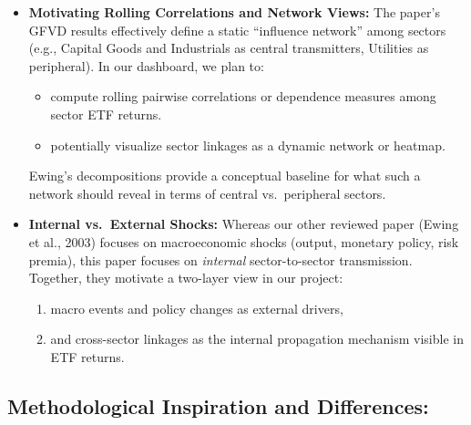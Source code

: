 \documentclass{article}
\begin{document}
\begin{itemize}
    \item \textbf{Motivating Rolling Correlations and Network Views:}  
    The paper’s GFVD results effectively define a static ``influence network'' among sectors (e.g., Capital Goods and Industrials as central transmitters, Utilities as peripheral). In our dashboard, we plan to:
    \begin{itemize}
        \item compute rolling pairwise correlations or dependence measures among sector ETF returns.
        \item potentially visualize sector linkages as a dynamic network or heatmap.
    \end{itemize}
    \noindent Ewing’s decompositions provide a conceptual baseline for what such a network should reveal in terms of central vs.\ peripheral sectors.

    \item \textbf{Internal vs.\ External Shocks:}  
    Whereas our other reviewed paper (Ewing et al., 2003) focuses on macroeconomic shocks (output, monetary policy, risk premia), this paper focuses on \textit{internal} sector-to-sector transmission. Together, they motivate a two-layer view in our project:
    \begin{enumerate}
        \item macro events and policy changes as external drivers,
        \item and cross-sector linkages as the internal propagation mechanism visible in ETF returns.
    \end{enumerate}
\end{itemize}


\subsection{Methodological Inspiration and Differences:}  
\end{document}
